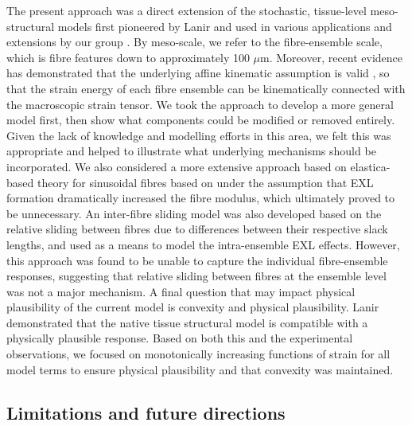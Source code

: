     The present approach was a direct extension of the stochastic, tissue-level meso-structural models first pioneered by Lanir \cite{lanir_constitutive_1983} and used in various applications and extensions by our group \cite{sacks_incorporation_2003}\cite{fata_insights_2014}\cite{zhang_meso_2016}. By meso-scale, we refer to the fibre-ensemble scale, which is fibre features down to approximately 100 $\mu$m. Moreover, recent evidence has demonstrated that the underlying affine kinematic assumption is valid \cite{fata_insights_2014}\cite{fan_simulation_2014}, so that the strain energy of each fibre ensemble can be kinematically connected with the macroscopic strain tensor. We took the approach to develop a more general model first, then show what components could be modified or removed entirely. Given the lack of knowledge and modelling efforts in this area, we felt this was appropriate and helped to illustrate what underlying mechanisms should be incorporated. We also considered a more extensive approach based on elastica-based theory for sinusoidal fibres based on \cite{garikipati_elastica_2008} under the assumption that EXL formation dramatically increased the fibre modulus, which ultimately proved to be unnecessary. An inter-fibre sliding model was also developed based on the relative sliding between fibres due to differences between their respective slack lengths, and used as a means to model the intra-ensemble EXL effects. However, this approach was found to be unable to capture the individual fibre-ensemble responses, suggesting that relative sliding between fibres at the ensemble level was not a major mechanism. A final question that may impact physical plausibility of the current model is convexity and physical plausibility. Lanir \cite{lanir_plausibility_1994} demonstrated that the native tissue structural model is compatible with a physically plausible response. Based on both this and the experimental observations, we focused on monotonically increasing functions of strain for all model terms to ensure physical plausibility and that convexity was maintained.
    



\subsection{Limitations and future directions}

